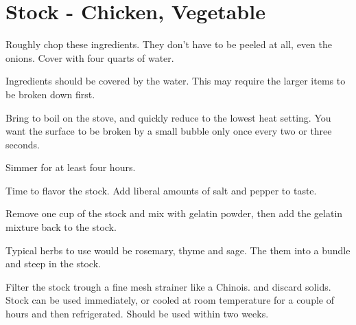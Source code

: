 \section{Stock - Chicken, Vegetable}
\begin{recipe}



Roughly chop these ingredients. They don't have to be peeled at all, even the onions. Cover with four quarts of water.


Ingredients should be covered by the water. This may require the larger items to be broken down first.

Bring to boil on the stove, and quickly reduce to the lowest heat setting. You want the surface to be broken by a small bubble only once every two or three seconds.

Simmer for at least four hours.


Time to flavor the stock. Add liberal amounts of salt and pepper to taste.


Remove one cup of the stock and mix with gelatin powder, then add the gelatin mixture back to the stock.

Typical herbs to use would be rosemary, thyme and sage. The them into a bundle and steep in the stock.

Filter the stock trough a fine mesh strainer like a Chinois. and discard solids. Stock can be used immediately, or cooled at room temperature for a couple of hours and then refrigerated. Should be used within two weeks.

\end{recipe}

